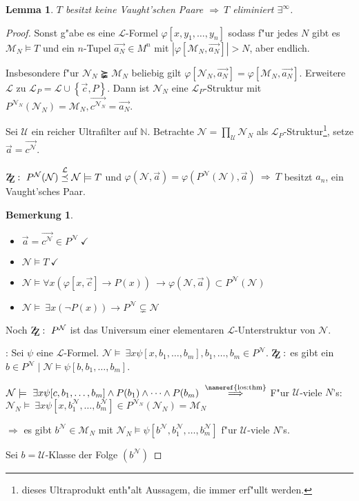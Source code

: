 \documentclass[a4paper,12pt,numbers=noenddot,parskip=full]{scrartcl}
\newcommand{\setN}{\mathbb{N}}
\newcommand{\Exists}{~\exists}
\newcommand{\scrL}{\mathcal{L}}
\newcommand{\scrU}{\mathcal{U}}
\newcommand{\scrM}{\mathcal{M}}
\newcommand{\scrN}{\mathcal{N}}
\newcommand{\zz}{\mathrm{Z\kern-.3em\raise-0.5ex\hbox{Z}}:~}
\theoremstyle{dotless}
\newtheorem{lemma}[theorem]{Lemma}
\newtheorem{remark}[theorem]{Bemerkung}
\begin{document}
\begin{lemma}
	$T$ besitzt keine Vaught'schen Paare $\Longrightarrow~ T$ eliminiert $\exists^\infty$.
\end{lemma}
\begin{proof}
	Sonst g"abe es eine $\scrL$-Formel $\varphi[x,y_1, \dots, y_n]$ sodass f"ur jedes $N$ gibt es $\scrM_N \models T$ und ein $n$-Tupel $\vec{a_N} \in M^n$ mit $|\varphi\left[\scrM_N, \vec{a_N}\right]|>N$, aber endlich.
	
	Insbesondere f"ur $\scrN_N \succneqq \scrM_N$ beliebig gilt $\varphi\left[\scrN_N, \vec{a_N}\right] = \varphi[\scrM_N, \vec{a_N}]$. Erweitere $\scrL$ zu $\scrL_P = \scrL \cup \left\{\vec{c},P \right\}$. Dann ist $\scrN_N$ eine $\scrL_P$-Struktur mit $P^{\scrN_N}(\scrN_N) = \scrM_N, \vec{c^{\scrN_N}} = \vec{a_N}$.
	
	Sei $\scrU$ ein reicher Ultrafilter auf $\setN$. Betrachte $\scrN = \prod\limits_\scrU \scrN_N$ als $\scrL_P$-Struktur\footnote{dieses Ultraprodukt enth"alt Aussagem, die immer erf"ullt werden.}, setze $\vec{a} = \vec{c^\scrN}$.
	
	$\zz P^\scrN(\scrN) \overset{\scrL}{\preceq} \scrN \models T$ und $\varphi(\scrN,\vec{a}) = \varphi(P^\scrN(\scrN),\vec{a})~\Rightarrow~T$ besitzt $a_n$, ein Vaught'sches Paar.
	
	\begin{remark}
		\begin{itemize}
			\item $\vec{a} = \vec{c^\scrN} \in P^\scrN~ \checkmark$
			\item $\scrN \models T~ \checkmark$
			\item $\scrN \models \forall x \left(\varphi\left[x, \vec{c}\right] \rightarrow P(x)\right)~ \rightarrow \varphi(\scrN,\vec{a})\subset P^\scrN(\scrN)$
			\item $\scrN \models \Exists x (\lnot P(x)) \rightarrow P^\scrN \subsetneq \scrN$
		\end{itemize}
	\end{remark}
	Noch $\zz P^\scrN$ ist das Universum einer elementaren $\scrL$-Unterstruktur von $\scrN$.
	
	\underline{}: Sei $\psi$ eine $\scrL$-Formel. $\scrN \models \Exists x \psi[x, b_1, \dots, b_m], b_1, \dots, b_m \in P^\scrN$. $\zz$es gibt ein $b \in P^\scrN \mid \scrN \models \psi[b,b_1, \dots, b_m]$.
	
	$\scrN \models \Exists x \psi[c,b_1, \dots, b_m] \land P(b_1) \land \dots \land P(b_m)~ \overset{\text{\nameref{los:thm}}}{\Longrightarrow}$ F"ur $\scrU$-viele $N$'s: $\scrN_N \models \Exists x \psi\left[x, b_1^\scrN, \dots, b_m^\scrN\right] \in P^{\scrN_N}(\scrN_N) = \scrM_N$
	
	$\Rightarrow$ es gibt $b^\scrN \in \scrM_N$ mit $\scrN_N \models \psi[b^\scrN, b_1^\scrN, \dots, b_m^\scrN]$ f"ur $\scrU$-viele $N$'s.
	
	Sei $b= \scrU$-Klasse der Folge $(b^\scrN)$
\end{proof}
\end{document}
